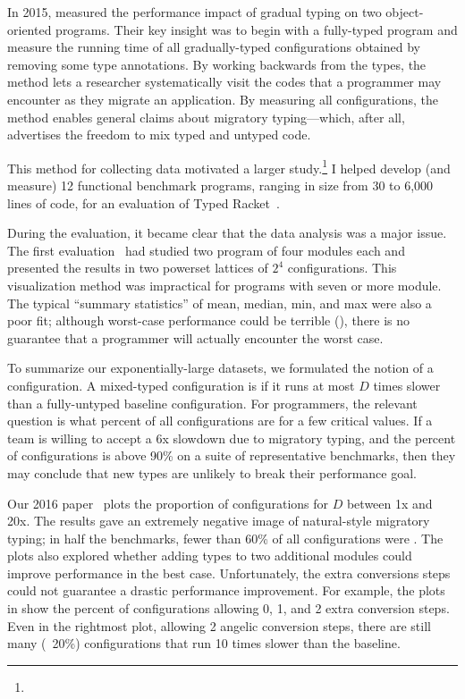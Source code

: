 In 2015,  measured the performance impact of gradual typing on
 two object-oriented programs.
Their key insight was to begin with a fully-typed program and measure the
 running time of all gradually-typed configurations obtained by removing
 some type annotations.
By working backwards from the types, the method lets a researcher systematically
 visit the codes that a programmer may encounter as they migrate an
 application.
By measuring all configurations, the method enables general claims about
 migratory typing---which, after all, advertises the freedom to mix typed
 and untyped code.

This method for collecting data motivated a larger study.\footnote{}
I helped develop (and measure) 12 functional benchmark programs, ranging in
 size from 30 to 6,000 lines of code, for an evaluation of Typed
 Racket~\cite{tfgnvf-popl-2016}.

During the evaluation, it became clear that the data analysis was a major
 issue.
The first evaluation~\cite{tfdfftf-ecoop-2015} had studied two program of four modules each
 and presented the results in two powerset lattices of $2^4$ configurations.
This visualization method was impractical for programs with seven or more
 module.
The typical ``summary statistics'' of mean, median, min, and max were also a
 poor fit; although worst-case performance could be terrible
 (), there is no guarantee that a programmer
 will actually encounter the worst case.

To summarize our exponentially-large datasets, we formulated the notion
 of a  configuration.
A mixed-typed configuration is  if it runs at most $D$ times
 slower than a fully-untyped baseline configuration.
For programmers, the relevant question is what percent of all configurations
 are  for a few critical values.
If a team is willing to accept a 6x slowdown due to migratory typing,
 and the percent of  configurations is above 90\% on a suite
 of representative benchmarks, then they may conclude that new types are
 unlikely to break their performance goal.

Our 2016 paper~\cite{tfgnvf-popl-2016} plots the proportion of
  configurations for $D$ between 1x and 20x.
The results gave an extremely negative image of natural-style migratory typing;
 in half the benchmarks, fewer than 60\% of all configurations were
 .
The plots also explored whether adding types to two additional modules could
 improve performance in the best case.
Unfortunately, the extra conversions steps could not guarantee a drastic
 performance improvement.
For example, the plots in  show the percent of
  configurations allowing 0, 1, and 2 extra conversion steps.
Even in the rightmost plot, allowing 2 angelic conversion steps, there are
 still many (~20\%) configurations that run 10 times slower than the baseline.

